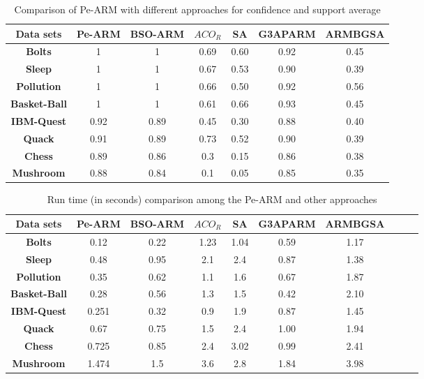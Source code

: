 \documentclass[preprint,12pt]{elsarticle}
\begin{document}
\begin{table}[htbp]
\small
\centering
\label{Fig3}
\caption{Comparison of Pe-ARM with different approaches for confidence and support average }
\begin{tabular}{c c c c c c c}
\toprule
\textbf{Data sets} &  Pe-ARM& BSO-ARM & $ACO_{R}$ & SA & G3APARM & ARMBGSA\\
\midrule
\textbf{Bolts}&		1&		1& 0.69 & 0.60 & 0.92 & 0.45\\\hline
\textbf{Sleep}&		1&		1& 0.67 & 0.53 & 0.90 & 0.39\\\hline
\textbf{Pollution}&		1&		1 & 0.66 & 0.50 & 0.92 & 0.56\\\hline
\textbf{Basket-Ball}&	 1&		1 & 0.61 & 0.66 & 0.93 & 0.45\\\hline
\textbf{IBM-Quest}&	 0.92&	0.89 &  0.45 & 0.30 & 0.88 & 0.40\\\hline
\textbf{Quack}&		0.91&		0.89& 0.73 & 0.52 & 0.90 & 0.39\\\hline
\textbf{Chess}&		0.89&		0.86 & 0.3 & 0.15 & 0.86 & 0.38\\\hline
\textbf{Mushroom}&	0.88 &	0.84 & 0.1 & 0.05 & 0.85 &0.35\\\hline
\bottomrule
\end{tabular}
\end{table}
\begin{table}[htbp]
\small
\centering
\label{Fig4}
\caption{ Run time (in seconds) comparison among the Pe-ARM and other approaches}
\begin{tabular}{c c c c c c c c c c}
\toprule
\textbf{Data sets} & Pe-ARM& BSO-ARM & $ACO_{R}$ & SA & G3APARM & ARMBGSA \\
\midrule
\textbf{Bolts}&			0.12&		0.22& 1.23 & 1.04 & 0.59 & 1.17 &\\\hline
\textbf{Sleep}&		0.48&		0.95& 2.1 & 2.4 & 0.87 & 1.38 &\\\hline
\textbf{Pollution}&		0.35&		0.62& 1.1 & 1.6 & 0.67 & 1.87 &\\\hline
\textbf{Basket-Ball}&		0.28&		0.56&  1.3 & 1.5 & 0.42 & 2.10 &\\\hline
\textbf{IBM-Quest}&		0.251&	0.32& 0.9 & 1.9 & 0.87 & 1.45 &\\\hline
\textbf{Quack}&		0.67&		0.75&  1.5 & 2.4 & 1.00 & 1.94 &\\\hline
\textbf{Chess}&		0.725&		0.85& 2.4 &  3.02 & 0.99& 2.41 &\\\hline
\textbf{Mushroom}&		1.474&	1.5& 3.6 & 2.8 & 1.84 & 3.98 &\\\hline
\bottomrule
\end{tabular}
\end{table}
\end{document}
